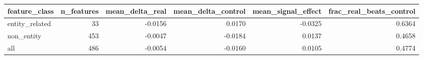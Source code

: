 \begin{tabular}{lrrrrr}
\toprule
feature\_class & n\_features & mean\_delta\_real & mean\_delta\_control & mean\_signal\_effect & frac\_real\_beats\_control \\
\midrule
entity\_related & 33 & -0.0156 & 0.0170 & -0.0325 & 0.6364 \\
non\_entity & 453 & -0.0047 & -0.0184 & 0.0137 & 0.4658 \\
all & 486 & -0.0054 & -0.0160 & 0.0105 & 0.4774 \\
\bottomrule
\end{tabular}
